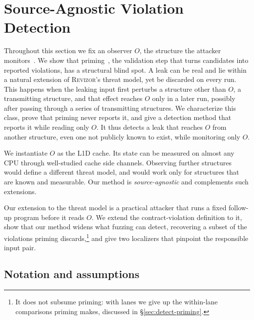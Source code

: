 \documentclass[letterpaper,twocolumn,10pt]{article}
\theoremstyle{definition}
\providecommand{\run}{\ensuremath{\mathit{run}}}
\providecommand{\IS}{\ensuremath{\mathrm{IS}}}
\providecommand{\obs}{\ensuremath{O}}
\providecommand{\Al}{\ensuremath{\mathit{Attack}_{\mathrm{L1D}}}}
\begin{document}
\section{Source-Agnostic Violation Detection}
\label{sec:detect}
\providecommand{\Al}{\mathit{Attack}_{\mathrm{L1D}}}
\providecommand{\IS}{\mathrm{IS}}
\providecommand{\run}{\mathit{run}}

Throughout this section we fix an observer $\obs$, the structure the attacker monitors~\cite{contracts}.
We show that priming~\cite{revizor}, the validation step that turns candidates into reported
violations, has a structural blind spot. A leak can be real and lie within a natural extension of
\textsc{Revizor}'s threat model, yet be discarded on every run. This happens when the leaking input first perturbs a
structure other than $\obs$, a transmitting structure, and that effect reaches $\obs$ only in a later run,
possibly after passing through a series of transmitting structures. We characterize this class,
prove that priming never reports it, and give a detection method that reports it while reading only
$\obs$. It thus detects a leak that reaches $\obs$ from another structure, even one not publicly known to
exist, while monitoring only $\obs$.

We instantiate $\obs$ as the L1D cache. Its state can be measured on almost any CPU through
well-studied cache side channels. Observing further structures would define a different threat
model, and would work only for structures that are known and measurable. Our method is
\emph{source-agnostic} and complements such extensions.

Our extension to the threat model is a practical attacker that runs a fixed follow-up program before
it reads $\obs$. We extend the contract-violation definition to it, show that our method widens what
fuzzing can detect, recovering a subset of the violations priming discards,\footnote{It does not
subsume priming: with lanes we give up the within-lane comparisons priming makes, discussed in
\S\ref{sec:detect-priming}.} and give two localizers that pinpoint the responsible input pair.

\subsection{Notation and assumptions}
\label{sec:detect-model}
\end{document}
